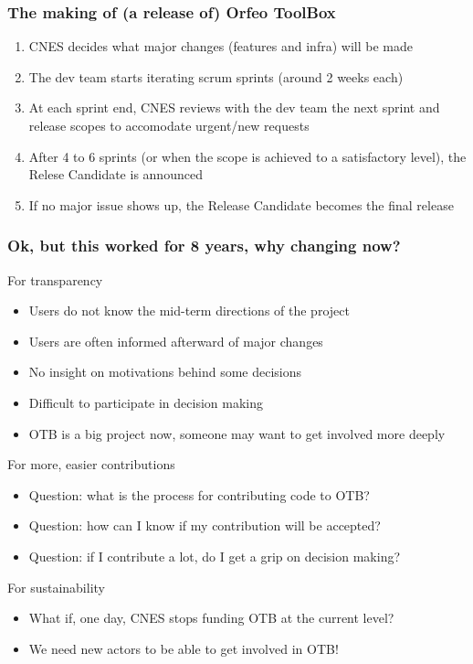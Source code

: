 \documentclass[8pt]{beamer}
\begin{document}
\begin{frame}
\frametitle{The making of (a release of) Orfeo ToolBox}
\begin{enumerate}
\item CNES decides what major changes (features and infra) will be made
\item The dev team starts iterating scrum sprints (around 2 weeks each)
\item At each sprint end, CNES reviews with the dev team the next sprint and release scopes to accomodate urgent/new requests 
\item After 4 to 6 sprints (or when the scope is achieved to a satisfactory level), the Relese Candidate is announced
\item If no major issue shows up, the Release Candidate becomes the final release
\end{enumerate}
\end{frame}

\begin{frame}
\frametitle{Ok, but this worked for 8 years, why changing now?}
\begin{block}{For transparency}
\begin{itemize}
\item Users do not know the mid-term directions of the project
\item Users are often informed afterward of major changes
\item No insight on motivations behind some decisions
\item Difficult to participate in decision making
\item OTB is a big project now, someone may want to get involved more deeply
\end{itemize}
\end{block}

\begin{block}{For more, easier contributions}
\begin{itemize}
\item Question: what is the process for contributing code to OTB? 
\item Question: how can I know if my contribution will be accepted?
\item Question: if I contribute a lot, do I get a grip on decision making?
\end{itemize}
\end{block}

\begin{block}{For sustainability}
\begin{itemize}
\item What if, one day, CNES stops funding OTB at the current level?
\item We need new actors to be able to get involved in OTB!
\end{itemize}
\end{block}
\end{frame}
\end{document}
